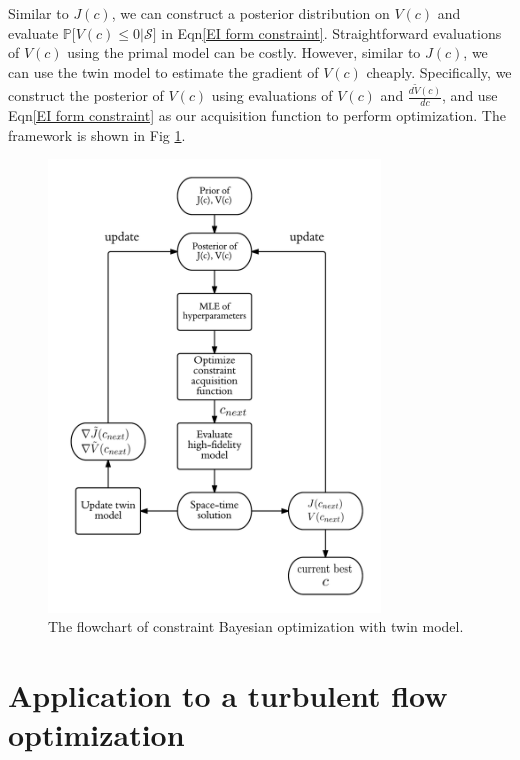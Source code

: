 \documentclass[a4paper,onecolumn]{article}
\theoremstyle{remark}
\begin{document}
\noindent Similar to $J(c)$, we can construct a posterior distribution on $V(c)$ and
evaluate $\mathbb{P}\big[V(c)\le 0 \big| \mathcal{S}\big] $ in Eqn\eqref{EI form constraint}.
Straightforward evaluations of $V(c)$
using the primal model can be costly.
However, similar to $J(c)$, we can use the twin model to estimate the gradient of $V(c)$
cheaply. Specifically, we construct the posterior of $V(c)$
using evaluations of $V(c)$ and $\frac{d\tilde{V}(c)}{dc}$, and use
Eqn\eqref{EI form constraint} as our acquisition function to perform optimization.
The framework is shown in Fig \ref{fig: constraint bay opt}.
\begin{figure}[H]
    \begin{center}
        \includegraphics[height=12cm]{Bayconstraint.png}
        \caption{The flowchart of constraint Bayesian optimization with twin model.}
        \label{fig: constraint bay opt}
    \end{center}
\end{figure}



\newpage
\section{Application to a turbulent flow optimization}
\label{examples}
\end{document}

